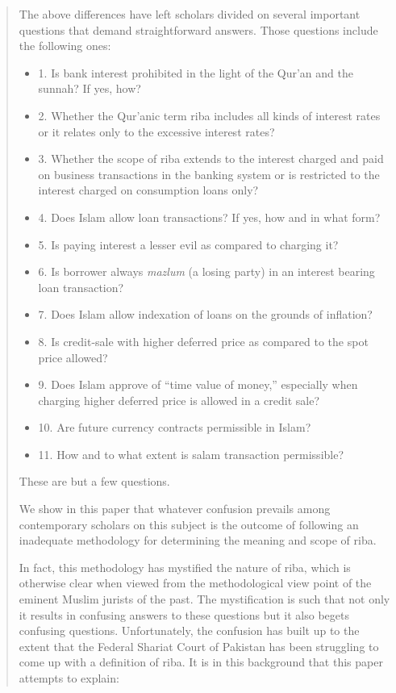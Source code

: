 \begin{quote}
The above differences have left scholars divided on several important questions that demand straightforward answers. Those questions include the following ones:
\begin{itemize}
    \item 
1. Is bank interest prohibited in the light of the Qur'an and the sunnah? If yes, how?
    \item 
2. Whether the Qur'anic term riba includes all kinds of interest rates or it relates only to the excessive interest rates?
    \item 
3. Whether the scope of riba extends to the interest charged and paid on business transactions in the banking system or is restricted to the interest charged on consumption loans only?
    \item 
4. Does Islam allow loan transactions? If yes, how and in what form?
    \item 
5. Is paying interest a lesser evil as compared to charging it?
    \item 
6. Is borrower always \textit{mazlum} (a losing party) in an interest bearing loan transaction?
    \item 
7. Does Islam allow indexation of loans on the grounds of inflation?
    \item 
8. Is credit-sale with higher deferred price as compared to the spot price allowed?
    \item 
9. Does Islam approve of “time value of money,” especially when charging higher deferred price is allowed in a credit sale?
    \item 
10. Are future currency contracts permissible in Islam?
    \item 
11. How and to what extent is salam transaction permissible?
\end{itemize}


These are but a few questions.
\begin{Synthesis}
We show in this paper that whatever confusion prevails among contemporary scholars on this subject is the outcome of following an inadequate methodology for determining the meaning and scope of riba.
\end{Synthesis}
 In fact, this methodology has mystified the nature of riba, which is otherwise clear when viewed from the methodological view point of the eminent Muslim jurists of the past. The mystification is such that not only it results in confusing answers to these questions but it also begets confusing questions. Unfortunately, the confusion has built up to the extent that the Federal Shariat Court of Pakistan has been struggling to come up with a definition of riba. It is in this background that this paper attempts to explain:


\end{quote}
